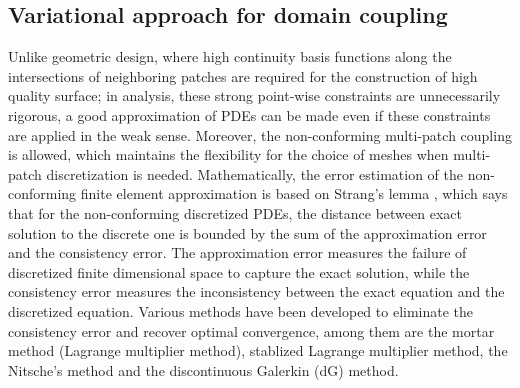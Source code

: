 \documentclass[preprint,12pt]{elsarticle}
\begin{document}
\subsection{Variational approach for domain coupling}
Unlike geometric design, where high continuity basis functions along the intersections of neighboring patches are required for the construction of high quality surface; in analysis, these strong point-wise constraints are unnecessarily rigorous, a good approximation of PDEs can be made even if these constraints are applied in the weak sense. Moreover, the non-conforming multi-patch coupling is allowed, which maintains the flexibility for the choice of meshes when multi-patch discretization is needed. Mathematically, the error estimation of the non-conforming finite element approximation is based on Strang's lemma \cite{brenner_mathematical_2007,strang_analysis_2008}, which says that for the non-conforming discretized PDEs, the distance between exact solution to the discrete one is bounded by the sum of the approximation error and the consistency error. The approximation error measures the failure of discretized finite dimensional space to capture the exact solution, while the consistency error measures the inconsistency between the exact equation and the discretized equation. Various methods have been developed to eliminate the consistency error and recover optimal convergence, among them are the mortar method (Lagrange multiplier method), stablized Lagrange multiplier method, the Nitsche's method and the discontinuous Galerkin (dG) method.\par
\end{document}
